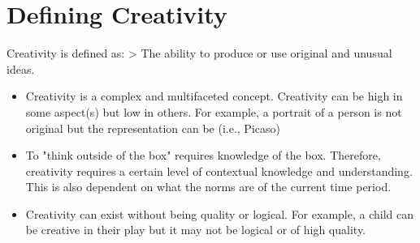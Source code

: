 \documentclass{article}
\begin{document}
\section{Defining Creativity}
Creativity is defined as:
> The ability to produce or use original and unusual ideas.
\begin{itemize}
    \item Creativity is a complex and multifaceted concept. Creativity can be high in some aspect(s) but low in others. For example, a portrait of a person is not original but the representation can be (i.e., Picaso)
    \item To "think outside of the box" requires knowledge of the box. Therefore, creativity requires a certain level of contextual knowledge and understanding. This is also dependent on what the norms are of the current time period.
    \item Creativity can exist without being quality or logical. For example, a child can be creative in their play but it may not be logical or of high quality.
\end{itemize}
\end{document}
